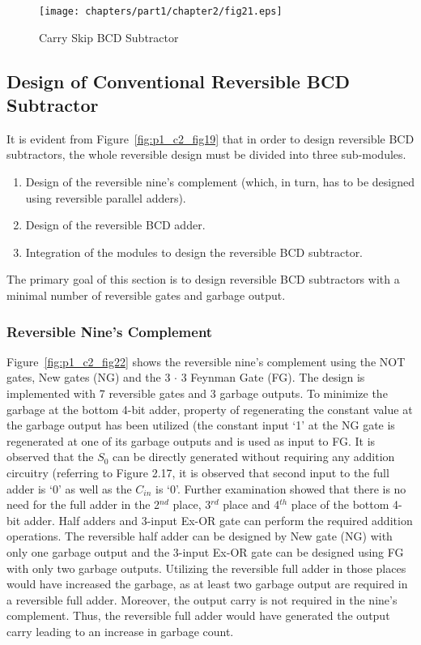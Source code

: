 \begin{figure}[!tbh]
	\centering
	\texttt{[image: chapters/part1/chapter2/fig21.eps]}
	\caption{Carry Skip BCD Subtractor}
	\label{fig:p1_c2_fig21}
\end{figure}


\subsection{Design of Conventional Reversible BCD Subtractor}
It is evident from Figure~\ref{fig:p1_c2_fig19} that in order to design reversible BCD subtractors, the whole reversible design must be divided into three sub-modules.
\begin{enumerate}
	\item  Design of the reversible nine's complement (which, in turn, has to be designed using reversible parallel adders).
	
	\item Design of the reversible BCD adder.
	
	\item Integration of the modules to design the reversible BCD subtractor.
\end{enumerate}

The primary goal of this section is to design reversible BCD subtractors with a minimal number of reversible gates and garbage output.

\subsubsection{Reversible Nine's Complement}

Figure~\ref{fig:p1_c2_fig22} shows the reversible nine's complement using the NOT gates, New gates (NG) and the 3 ${\cdot}$ 3 Feynman Gate (FG). The design is implemented with 7 reversible gates and 3 garbage outputs. To minimize the garbage at the bottom 4-bit adder, property of regenerating the constant value at the garbage output has been utilized (the constant input `1' at the NG gate is regenerated at one of its garbage outputs and is used as input to FG. It is observed that the $S_0$ can be directly generated without requiring any addition circuitry (referring to Figure 2.17, it is observed that second input to the full adder is `0' as well as the $C_{in}$ is `0'. Further examination showed that there is no need for the full adder in the 2${}^{nd}$ place, 3${}^{rd}$ place and 4${}^{th}$ place of the bottom 4-bit adder. Half adders and 3-input Ex-OR gate can perform the required addition operations. The reversible half adder can be designed by New gate (NG) with only one garbage output and the 3-input Ex-OR gate can be designed using FG with only two garbage outputs. Utilizing the reversible full adder in those places would have increased the garbage, as at least two garbage output are required in a reversible full adder. Moreover, the output carry is not required in the nine's complement. Thus, the reversible full adder would have generated the output carry leading to an increase in garbage count.

